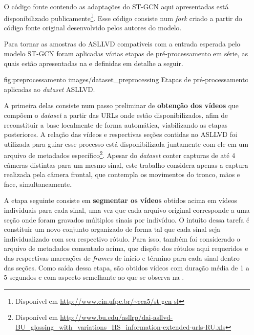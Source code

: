 O código fonte contendo as adaptações do ST-GCN aqui apresentadas está disponibilizado publicamente\footnote{
    Disponível em \url{http://www.cin.ufpe.br/~cca5/st-gcn-sl}
}. Esse código consiste num \textit{fork} criado a partir do código fonte original desenvolvido pelos autores do modelo.



Para tornar as amostras do ASLLVD compatíveis com a entrada esperada pelo modelo ST-GCN foram aplicadas várias etapas de pré-processamento em série, as quais estão apresentadas na  e definidas em detalhe a seguir.


\image
    {fig:preprocessamento}
    {images/dataset_preprocessing}
    {Etapas de pré-processamento aplicadas ao \textit{dataset} ASLLVD.}

A primeira delas consiste num passo preliminar de \textbf{obtenção dos vídeos} que compõem o \textit{dataset} a partir das URLs onde estão disponibilizados, afim de reconstituir a base localmente de forma automática, viabilizando as etapas posteriores. A relação das vídeos e respectivas seções contidas no ASLLVD foi utilizada para guiar esse processo está disponibilizada juntamente com ele em um arquivo de metadados específico\footnote{
    Disponível em \url{http://www.bu.edu/asllrp/dai-asllvd-BU_glossing_with_variations_HS_information-extended-urls-RU.xls}
}. Apesar do \textit{dataset} conter capturas de até 4 câmeras distintas para um mesmo sinal, este trabalho considera apenas a captura realizada pela câmera frontal, que contempla os movimentos do tronco, mãos e face, simultaneamente.

A etapa seguinte consiste em \textbf{segmentar os vídeos} obtidos acima em vídeos individuais para cada sinal, uma vez que cada arquivo original corresponde a uma seção onde foram gravados múltiplos sinais por indivíduo. O intuito dessa tarefa é constituir um novo conjunto organizado de forma tal que cada sinal seja individualizado com seu respectivo rótulo. Para isso, também foi considerado o arquivo de metadados comentado acima, que dispõe dos rótulos aqui requeridos e das respectivas marcações de \textit{frames} de início e término para cada sinal dentro das seções. Como saída dessa etapa, são obtidos vídeos com duração média de 1 a 5 segundos e com aspecto semelhante ao que se observa na .


